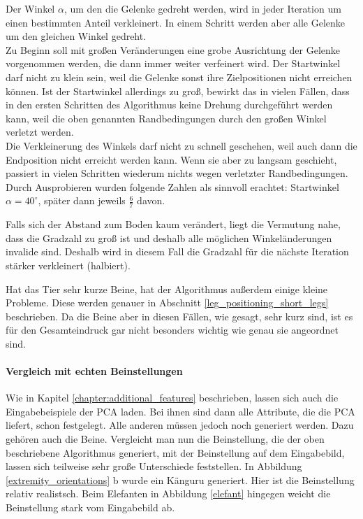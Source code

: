Der Winkel $\alpha$, um den die Gelenke gedreht werden, wird in jeder Iteration um einen bestimmten Anteil verkleinert. In einem Schritt werden aber alle Gelenke um den gleichen Winkel gedreht.\\
Zu Beginn soll mit großen Veränderungen eine grobe Ausrichtung der Gelenke vorgenommen werden, die dann immer weiter verfeinert wird.
Der Startwinkel darf nicht zu klein sein, weil die Gelenke sonst ihre Zielpositionen nicht erreichen können. Ist der Startwinkel allerdings zu groß, bewirkt das in vielen Fällen, dass in den ersten Schritten des Algorithmus keine Drehung durchgeführt werden kann, weil die oben genannten Randbedingungen durch den großen Winkel verletzt werden.\\
Die Verkleinerung des Winkels darf nicht zu schnell geschehen, weil auch dann die Endposition nicht erreicht werden kann. Wenn sie aber zu langsam geschieht, passiert in vielen Schritten wiederum nichts wegen verletzter Randbedingungen.\\
Durch Ausprobieren wurden folgende Zahlen als sinnvoll erachtet: Startwinkel $\alpha = 40^{\circ}$, später dann jeweils $\frac{6}{7}$ davon.

Falls sich der Abstand zum Boden kaum verändert, liegt die Vermutung nahe, dass die Gradzahl zu groß ist und deshalb alle möglichen Winkeländerungen invalide sind. Deshalb wird in diesem Fall die Gradzahl für die nächste Iteration stärker verkleinert (halbiert).

Hat das Tier sehr kurze Beine, hat der Algorithmus außerdem einige kleine Probleme. Diese werden genauer in Abschnitt \ref{leg_positioning_short_legs} beschrieben. Da die Beine aber in diesen Fällen, wie gesagt, sehr kurz sind, ist es für den Gesamteindruck gar nicht besonders wichtig wie genau sie angeordnet sind.

\paragraph{Vergleich mit echten Beinstellungen}
Wie in Kapitel \ref{chapter:additional_features} beschrieben, lassen sich auch die Eingabebeispiele der PCA laden. Bei ihnen sind dann alle Attribute, die die PCA liefert, schon festgelegt. Alle anderen müssen jedoch noch generiert werden.
Dazu gehören auch die Beine.
Vergleicht man nun die Beinstellung, die der oben beschriebene Algorithmus generiert, mit der Beinstellung auf dem Eingabebild, lassen sich teilweise sehr große Unterschiede feststellen. In Abbildung \ref{extremity_orientations} b wurde ein Känguru generiert. Hier ist die Beinstellung relativ realistsch. Beim Elefanten in Abbildung \ref{elefant} hingegen weicht die Beinstellung stark vom Eingabebild ab.

